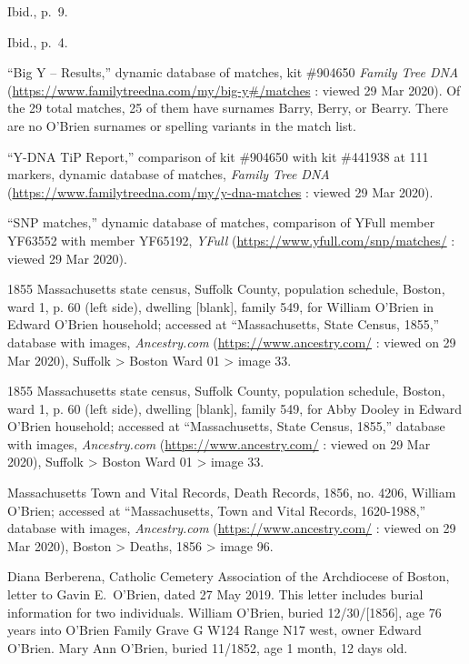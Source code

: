 \begin{thebibliography}{999}
	Ibid., p.\ 9.
	
	Ibid., p.\ 4.
	
	``Big Y -- Results,'' dynamic database of matches, kit \#904650 \textit{Family Tree DNA} (\url{https://www.familytreedna.com/my/big-y#/matches} : viewed 29 Mar 2020). Of the 29 total matches, 25 of them have surnames Barry, Berry, or Bearry. There are no O'Brien surnames or spelling variants in the match list.
	
	``Y-DNA TiP Report,'' comparison of kit \#904650 with kit \#441938 at 111 markers, dynamic database of matches, \textit{Family Tree DNA} (\url{https://www.familytreedna.com/my/y-dna-matches} : viewed 29 Mar 2020).
	
	``SNP matches,'' dynamic database of matches, comparison of YFull member YF63552 with member YF65192, \textit{YFull} (\url{https://www.yfull.com/snp/matches/} : viewed 29 Mar 2020).
	
	1855 Massachusetts state census, Suffolk County, population schedule, Boston, ward 1, p. 60 (left side), dwelling [blank], family 549, for William O'Brien in Edward O'Brien household; accessed at ``Massachusetts, State Census, 1855,'' database with images, \textit{Ancestry.com} (\url{https://www.ancestry.com/} : viewed on 29 Mar 2020), Suffolk > Boston Ward 01 > image 33.
	
	1855 Massachusetts state census, Suffolk County, population schedule, Boston, ward 1, p. 60 (left side), dwelling [blank], family 549, for Abby Dooley in Edward O'Brien household; accessed at ``Massachusetts, State Census, 1855,'' database with images, \textit{Ancestry.com} (\url{https://www.ancestry.com/} : viewed on 29 Mar 2020), Suffolk > Boston Ward 01 > image 33.
		
	Massachusetts Town and Vital Records, Death Records, 1856, no. 4206, William O'Brien; accessed at ``Massachusetts, Town and Vital Records, 1620-1988,'' database with images, \textit{Ancestry.com} (\url{https://www.ancestry.com/} : viewed on 29 Mar 2020), Boston > Deaths, 1856 > image 96.
		
	Diana Berberena, Catholic Cemetery Association of the Archdiocese of Boston, letter to Gavin E.\ O'Brien, dated 27 May 2019. This letter includes burial information for two individuals. William O'Brien, buried 12/30/[1856], age 76 years into O'Brien Family Grave G W124 Range N17 west, owner Edward O'Brien. Mary Ann O'Brien, buried 11/1852, age 1 month, 12 days old.
	

\end{thebibliography}
